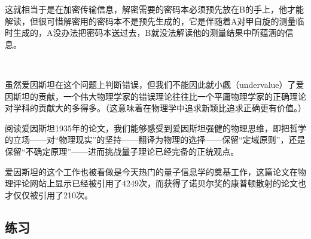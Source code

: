 这就相当于是在加密传输信息，解密需要的密码本必须预先放在B的手上，他才能解读，但很可惜解密用的密码本不是预先生成的，它是伴随着A对甲自旋的测量临时生成的，A没办法把密码本送过去，B就没法解读他的测量结果中所蕴涵的信息。

~

虽然爱因斯坦在这个问题上判断错误，但我们不能因此就小觑（undervalue）了爱因斯坦的贡献，一个伟大物理学家的错误理论往往比一个平庸物理学家的正确理论对学科的贡献大的多得多。（这意味着在物理学中追求新颖比追求正确更有价值。）

阅读爱因斯坦1935年的论文，我们能够感受到爱因斯坦强健的物理思维，即把哲学的立场——对“物理现实”的坚持——翻译为物理的选择——保留“定域原则”，还是保留“不确定原理”——进而挑战量子理论已经完备的正统观点。

爱因斯坦的这个工作也被看做是今天热门的量子信息学的奠基工作，这篇论文在物理评论网站上显示已经被引用了4249次，而获得了诺贝尔奖的康普顿散射的论文也才仅仅被引用了210次。

\subsection*{练习}

